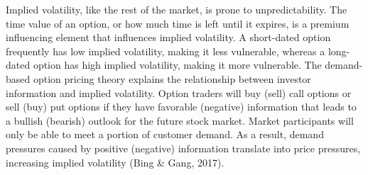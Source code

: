\documentclass[a4 paper, 12pt]{report}
\theoremstyle{plain}
\begin{document}
\par Implied volatility, like the rest of the market, is prone to unpredictability. The time value of an option, or how much time is left until it expires, is a premium influencing element that influences implied volatility. A short-dated option frequently has low implied volatility, making it less vulnerable, whereas a long-dated option has high implied volatility, making it more vulnerable. The demand-based option pricing theory explains the relationship between investor information and implied volatility. Option traders will buy (sell) call options or sell (buy) put options if they have favorable (negative) information that leads to a bullish (bearish) outlook for the future stock market. Market participants will only be able to meet a portion of customer demand. As a result, demand pressures caused by positive (negative) information translate into price pressures, increasing implied volatility (Bing \& Gang, 2017).




\end{document}
